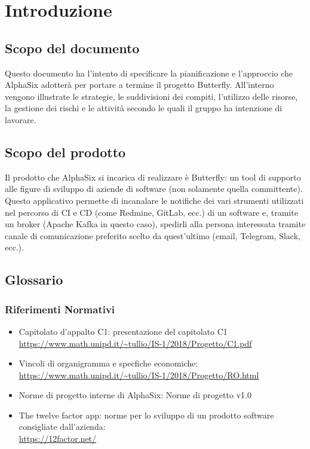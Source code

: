 \newpage
\section{Introduzione} \label{Introduzione}
	
	\subsection{Scopo del documento}
	Questo documento ha l'intento di specificare la pianificazione e l'approccio che AlphaSix adotterà per portare a termine il progetto Butterfly.
	All'interno vengono illustrate le strategie, le suddivisioni dei compiti, l'utilizzo delle risorse, la gestione dei rischi e le attività secondo le quali il gruppo ha intenzione di lavorare.
	
	\subsection{Scopo del prodotto}	
	Il prodotto che AlphaSix si incarica di realizzare è Butterfly: un tool di supporto alle figure di sviluppo di aziende di software (non solamente quella committente).
	Questo applicativo permette di incanalare le notifiche dei vari strumenti utilizzati nel percorso di CI e CD (come Redmine, GitLab, ecc.) di un software e, tramite un broker (Apache Kafka in questo caso), spedirli alla persona interessata tramite canale di comunicazione
	preferito scelto da quest'ultimo (email, Telegram, Slack, ecc.).
	
	\subsection{Glossario}
		\subsubsection{Riferimenti Normativi}
			\begin{itemize}
				\item Capitolato d'appalto C1: presentazione del capitolato C1\\
				\url{https://www.math.unipd.it/~tullio/IS-1/2018/Progetto/C1.pdf}
				\item Vincoli di organigramma e specfiche economiche:\\
				\url{https://www.math.unipd.it/~tullio/IS-1/2018/Progetto/RO.html}
				\item Norme di progetto interne di AlphaSix: Norme di progetto v1.0
				\item The twelve factor app: norme per lo sviluppo di un prodotto software consigliate dall'azienda:\\
				\url{https://12factor.net/}
			\end{itemize}
		

